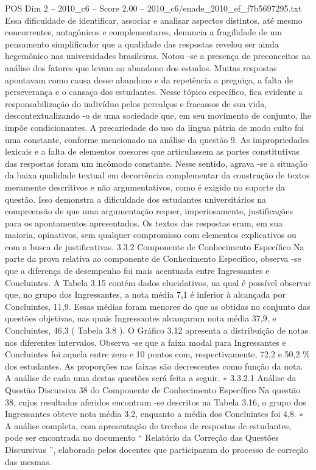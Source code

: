 \begin{textsample}{POS Dim 2 – 2010\_c6 – Score 2.00 – 2010\_c6/enade\_2010\_ef\_f7b5697295.txt}
Essa dificuldade de identificar, associar e analisar aspectos distintos, até mesmo concorrentes, antagônicos e complementares, denuncia a fragilidade de um pensamento simplificador que a qualidade das respostas revelou ser ainda hegemônico nas universidades brasileiras.
Notou -se a presença de preconceitos na análise dos fatores que levam ao abandono dos estudos.
Muitas respostas apontavam como causa desse abandono e da repetência a preguiça, a falta de perseverança e o cansaço dos estudantes.
Nesse tópico específico, fica evidente a responsabilização do indivíduo pelos percalços e fracassos de sua vida, descontextualizando -o de uma sociedade que, em seu movimento de conjunto, lhe impõe condicionantes.
A precariedade do uso da língua pátria de modo culto foi uma constante, conforme mencionado na análise da questão 9.
As impropriedades lexicais e a falta de elementos coesores que articulassem as partes constitutivas das respostas foram um incômodo constante.
Nesse sentido, agrava -se a situação da baixa qualidade textual em decorrência complementar da construção de textos meramente descritivos e não argumentativos, como é exigido no suporte da questão.
Isso demonstra a dificuldade dos estudantes universitários na compreensão de que uma argumentação requer, imperiosamente, justificações para os apontamentos apresentados.
Os textos das respostas eram, em sua maioria, opinativos, sem qualquer compromisso com elementos explicativos ou com a busca de justificativas. 3.3.2 Componente de Conhecimento Específico Na parte da prova relativa ao componente de Conhecimento Específico, observa -se que a diferença de desempenho foi mais acentuada entre Ingressantes e Concluintes.
A Tabela 3.15 contém dados elucidativos, na qual é possível observar que, no grupo dos Ingressantes, a nota média 7,1 é inferior à alcançada por Concluintes, 11,9.
Essas médias foram menores do que as obtidas no conjunto das questões objetivas, nas quais Ingressantes alcançaram nota média 37,9, e Concluintes, 46,3 ( Tabela 3.8 ).
O Gráfico 3.12 apresenta a distribuição de notas nos diferentes intervalos.
Observa -se que a faixa modal para Ingressantes e Concluintes foi aquela entre zero e 10 pontos com, respectivamente, 72,2 e 50,2 \% dos estudantes.
As proporções nas faixas são decrescentes como função da nota.
A análise de cada uma destas questões será feita a seguir. ∗ 3.3.2.1 Análise da Questão Discursiva 38 do Componente de Conhecimento Específico Na questão 38, cujos resultados aferidos encontram -se descritos na Tabela 3.16, o grupo dos Ingressantes obteve nota média 3,2, enquanto a média dos Concluintes foi 4,8. ∗ A análise completa, com apresentação de trechos de respostas de estudantes, pode ser encontrada no documento “ Relatório da Correção das Questões Discursivas ”, elaborado pelos docentes que participaram do processo de correção das mesmas.

\end{textsample}
